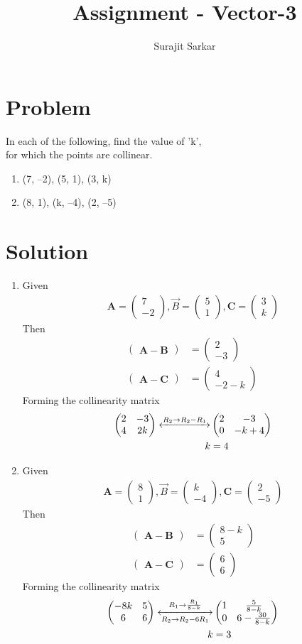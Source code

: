 \documentclass[journal,12pt,twocolumn]{IEEEtran}
\title{\mytitle}
\title{
Assignment - Vector-3
}
\author{Surajit Sarkar}
\newcommand{\myvec}[1]{\ensuremath{\begin{pmatrix}#1\end{pmatrix}}}
\let\vec\mathbf
\begin{document}
\maketitle
\tableofcontents
\bigskip
\section{\textbf{Problem}}
In each of the following, find the value of ’k’,\\ for which the points are collinear.
\begin{enumerate}[label=(\roman*)]
\item (7, –2), (5, 1), (3, k)
\item(8, 1), (k, –4), (2, –5)
\end{enumerate}
\section{\textbf{Solution}}
\begin{enumerate}[label=(\roman*)]
    \item Given
    \begin{align}
      \vec{A}=\myvec{7\\-2},\Vec{B}=\myvec{5\\1},\vec{C}=\myvec{3\\k}  
    \end{align}
    Then
    \begin{align}
        \myvec{\vec{A}-\vec{B}}&=\myvec{2\\-3}\\
        \myvec{\vec{A}-\vec{C}}&=\myvec{4\\-2-k}\
    \end{align}
    Forming the collinearity matrix
    \begin{align}
        \myvec{2&-3\\4&2k} \xleftrightarrow{R_2\rightarrow R_2-R_1}&\myvec{2&-3\\0&-k+4}\\
        k&=4
        \end{align}
    
    \item Given
     \begin{align}
      \vec{A}=\myvec{8\\1},\Vec{B}=\myvec{k\\-4},\vec{C}=\myvec{2\\-5}  
    \end{align}
    Then
    \begin{align}
        \myvec{\vec{A}-\vec{B}}&=\myvec{8-k\\5}\\
        \myvec{\vec{A}-\vec{C}}&=\myvec{6\\6}\
    \end{align}
    Forming the collinearity matrix
    \begin{align}
        \myvec{-8k&5\\6&6} \xleftrightarrow[R_2\rightarrow R_2-6R_1]{R_1\rightarrow \frac{R_1}{8-k}}&\myvec{1&\frac{5}{8-k}\\0&6-\frac{30}{8-k}}\\
        k&=3
        \end{align}
\end{enumerate}
\end{document}
